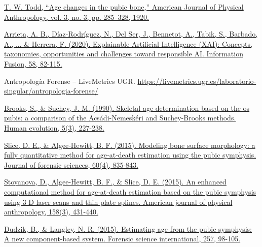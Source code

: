 
\begin{thebibliography}{9}



	\href{https://onlinelibrary.wiley.com/doi/abs/10.1002/ajpa.1330030301}{T. W. Todd, “Age changes in the pubic bone,” American Journal of Physical Anthropology, vol. 3, no. 3, pp. 285–328, 1920.}




	\href{https://www.sciencedirect.com/science/article/pii/S1566253519308103?via%3Dihub}{Arrieta, A. B., Díaz-Rodríguez, N., Del Ser, J., Bennetot, A., Tabik, S., Barbado, A., ... \& Herrera, F. (2020). Explainable Artificial Intelligence (XAI): Concepts, taxonomies, opportunities and challenges toward responsible AI. Information Fusion, 58, 82-115.}



	Antropología Forense – LiveMetrics UGR. \url{https://livemetrics.ugr.es/laboratorio-singular/antropologia-forense/}


	\href{https://link.springer.com/article/10.1007/BF02437238}{Brooks, S., \& Suchey, J. M. (1990). Skeletal age determination based on the os pubis: a comparison of the Acsádi-Nemeskéri and Suchey-Brooks methods. Human evolution, 5(3), 227-238.}


	\href{https://onlinelibrary.wiley.com/doi/full/10.1111/1556-4029.12778}{Slice, D. E., \& Algee‐Hewitt, B. F. (2015). Modeling bone surface morphology: a fully quantitative method for age‐at‐death estimation using the pubic symphysis. Journal of forensic sciences, 60(4), 835-843.}


	\href{https://onlinelibrary.wiley.com/doi/full/10.1002/ajpa.22797}{Stoyanova, D., Algee‐Hewitt, B. F., \& Slice, D. E. (2015). An enhanced computational method for age‐at‐death estimation based on the pubic symphysis using 3 D laser scans and thin plate splines. American journal of physical anthropology, 158(3), 431-440.}




	\href{https://www.sciencedirect.com/science/article/pii/S0379073815003254}{Dudzik, B., \& Langley, N. R. (2015). Estimating age from the pubic symphysis: A new component-based system. Forensic science international, 257, 98-105.}


\end{thebibliography}

